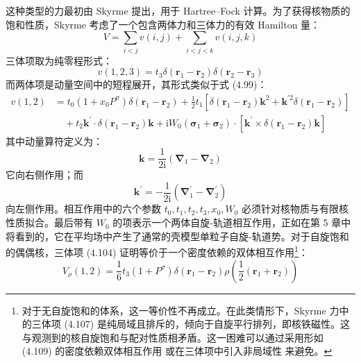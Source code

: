 这种类型的力最初由 Skyrme \cite{Sk56,Sk59} 提出，用于 Hartree–Fock 计算。为了获得核物质的饱和性质，Skyrme
考虑了一个包含两体力和三体力的有效 Hamilton 量：
\begin{equation}
V=\sum_{i<j}v(i,j)+\sum_{i<j<k}v(i,j,k)\label{eq:4.103}
\end{equation}
三体项取为纯零程形式：
\begin{equation}
v(1,2,3)=t_{3}\delta(\boldsymbol{r}_{1}-\boldsymbol{r}_{2})\delta(\boldsymbol{r}_{2}-\boldsymbol{r}_{3})\label{eq:4.104}
\end{equation}
而两体项是动量空间中的短程展开，其形式类似于式 (4.99)：
\begin{align}
v(1,2) & =t_{0}(1+x_{0}P^{\sigma})\delta(\boldsymbol{r}_{1}-\boldsymbol{r}_{2})+\frac{1}{2}t_{1}[\delta(\boldsymbol{r}_{1}-\boldsymbol{r}_{2})\boldsymbol{k}^{2}+\boldsymbol{k}^{\prime2}\delta(\boldsymbol{r}_{1}-\boldsymbol{r}_{2})]\nonumber \\
 & \quad+t_{2}\boldsymbol{k}^{\prime}\cdot\delta(\boldsymbol{r}_{1}-\boldsymbol{r}_{2})\boldsymbol{k}+\mathrm{i}W_{0}(\boldsymbol{\sigma}_{1}+\boldsymbol{\sigma}_{2})\cdot[\boldsymbol{k}^{\prime}\times\delta(\boldsymbol{r}_{1}-\boldsymbol{r}_{2})\boldsymbol{k}]\label{eq:4.105}
\end{align}
其中动量算符定义为：
\begin{equation}
\boldsymbol{k}=\frac{1}{2\mathrm{i}}(\boldsymbol{\nabla}_{1}-\boldsymbol{\nabla}_{2})\label{eq:4.106}
\end{equation}
它向右侧作用；而
\begin{equation}
\boldsymbol{k}^{\prime}=-\frac{1}{2\mathrm{i}}(\boldsymbol{\nabla}^{\prime}_{1}-\boldsymbol{\nabla}^{\prime}_{2})\label{eq:4.107}
\end{equation}
向左侧作用。相互作用中的六个参数 $t_{0},t_{1},t_{2},t_{3},x_{0},W_{0}$ 必须针对核物质与有限核性质拟合。最后带有
$W_{0}$ 的项表示一个两体自旋-轨道相互作用，正如在第 5 章中将看到的，它在平均场中产生了通常的壳模型单粒子自旋-轨道势。对于自旋饱和的偶偶核，三体项
(4.104) 证明等价于一个密度依赖的双体相互作用\footnote{对于无自旋饱和的体系，这一等价性不再成立。在此类情形下，Skyrme 力中的三体项 (4.107) 是纯局域且排斥的，倾向于自旋平行排列，即核铁磁性。这与观测到的核自旋饱和与配对性质相矛盾。这一困难可以通过采用形如
(4.109) 的密度依赖双体相互作用 \cite{BJS75} 或在三体项中引入非局域性 \cite{ON78} 来避免。}：
\begin{equation}
V_{\rho}(1,2)=\frac{1}{6}t_{3}(1+P^{\sigma})\delta(\boldsymbol{r}_{1}-\boldsymbol{r}_{2})\rho\left(\frac{1}{2}(\boldsymbol{r}_{1}+\boldsymbol{r}_{2})\right)\label{eq:4.109}
\end{equation}

